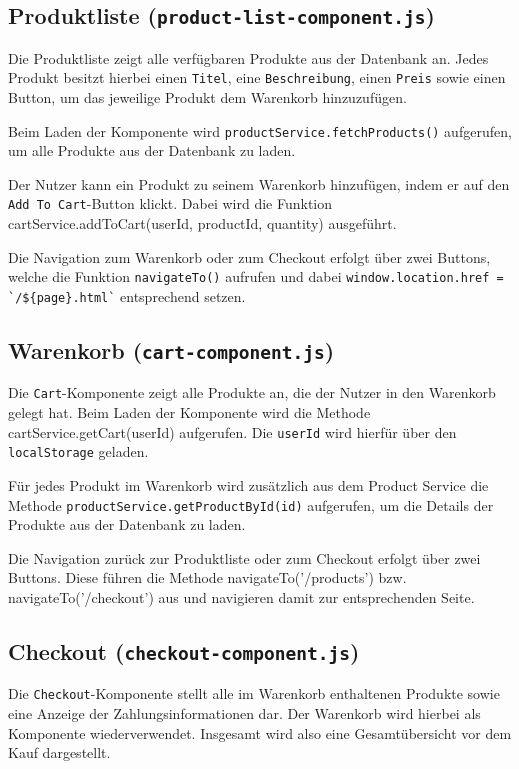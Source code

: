 \documentclass[oneside]{ausarbeitung}
\begin{document}
\subsection{Produktliste (\texttt{product-list-component.js})}

Die Produktliste zeigt alle verfügbaren Produkte aus der Datenbank an. Jedes Produkt besitzt hierbei einen \texttt{Titel}, eine \texttt{Beschreibung}, einen \texttt{Preis} sowie einen Button, um das jeweilige Produkt dem Warenkorb hinzuzufügen. 

Beim Laden der Komponente wird \texttt{productService.fetchProducts()} aufgerufen, um alle Produkte aus der Datenbank zu laden.

Der Nutzer kann ein Produkt zu seinem Warenkorb hinzufügen, indem er auf den \texttt{Add To Cart}-Button klickt. Dabei wird die Funktion cartService.addToCart(userId, productId, quantity) ausgeführt.

Die Navigation zum Warenkorb oder zum Checkout erfolgt über zwei Buttons, welche die Funktion \texttt{navigateTo()} aufrufen und dabei \texttt{window.location.href = \`{}/\$\{page\}.html\`} entsprechend setzen.


\subsection{Warenkorb (\texttt{cart-component.js})}

Die \texttt{Cart}-Komponente zeigt alle Produkte an, die der Nutzer in den Warenkorb gelegt hat. Beim Laden der Komponente wird die Methode cartService.getCart(userId) aufgerufen. Die \texttt{userId} wird hierfür über den \texttt{localStorage} geladen. 

Für jedes Produkt im Warenkorb wird zusätzlich aus dem Product Service die Methode \texttt{productService.getProductById(id)} aufgerufen, um die Details der Produkte aus der Datenbank zu laden.

Die Navigation zurück zur Produktliste oder zum Checkout erfolgt über zwei Buttons. Diese führen die Methode navigateTo('/products') bzw. navigateTo('/checkout') aus und navigieren damit zur entsprechenden Seite.


\subsection{Checkout (\texttt{checkout-component.js})}

Die \texttt{Checkout}-Komponente stellt alle im Warenkorb enthaltenen Produkte sowie eine Anzeige der Zahlungsinformationen dar. Der Warenkorb wird hierbei als Komponente wiederverwendet. Insgesamt wird also eine Gesamtübersicht vor dem Kauf dargestellt.
\end{document}
